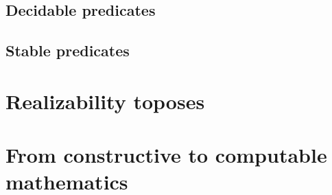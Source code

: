 \subsection{Decidable predicates}
\label{sec:decidable-predicates}


\subsection{Stable predicates}
\label{sec:stable-predicates}




\section{Realizability toposes}
\label{sec:realizability-toposes}

\section{From constructive to computable mathematics}
\label{sec:constructive-math}





